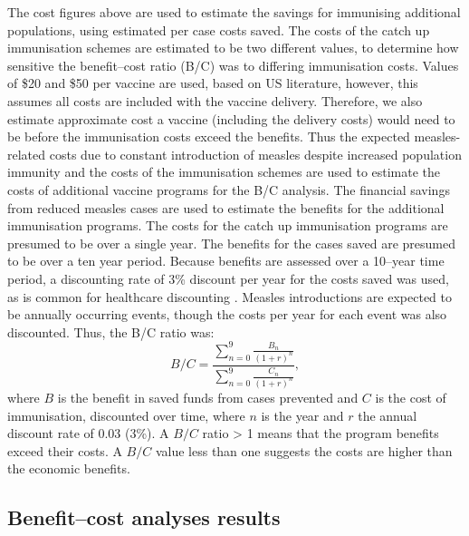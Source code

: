 \documentclass{article}
\begin{document}
The cost figures above are used to estimate the savings for immunising additional populations, using estimated per case costs saved. The costs of the catch up immunisation schemes are estimated to be two different values, to determine how sensitive the benefit--cost ratio (B/C) was to differing immunisation costs. Values of \$20 and \$50 per vaccine are used, based on US literature, however, this assumes all costs are included with the vaccine delivery. Therefore, we also estimate approximate cost a vaccine (including the delivery costs) would need to be before the immunisation costs exceed the benefits. Thus the expected measles-related costs due to constant introduction of measles despite increased population immunity and the costs of the immunisation schemes are used to estimate the costs of additional vaccine programs for the B/C analysis. The financial savings from reduced measles cases are used to estimate the benefits for the additional immunisation programs. The costs for the catch up immunisation programs are presumed to be over a single year. The benefits for the cases saved are presumed to be over a ten year period. Because benefits are assessed over a 10--year time period, a discounting rate of 3\% discount per year for the costs saved was used, as is common for healthcare discounting \citep{honeycutt6}. Measles introductions are expected to be annually occurring events, though the costs per year for each event was also discounted. Thus, the B/C ratio was:
\begin{equation} \label{eq:bc}
 \textit{B/C} = \frac{\sum\limits_{n=0}^{9} \frac{B_n}{(1+r)^n}}{\sum\limits_{n=0}^{9} \frac{C_n}{(1+r)^n}},
 \end{equation}
where $B$ is the benefit in saved funds from cases prevented and $C$ is the cost of immunisation, discounted over time, where $n$ is the year and $r$ the annual discount rate of 0.03 (3\%).
A $B/C$ ratio > 1 means that the program benefits exceed their costs. A $B/C$ value less than one suggests the costs are higher than the economic benefits.

\subsection{Benefit--cost analyses results}
\end{document}
